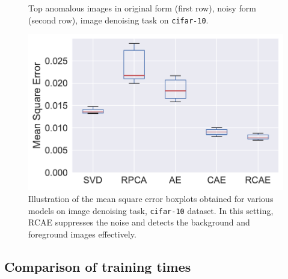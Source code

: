 \begin{figure}[!t]
	\centering
	\caption{Top anomalous images in original form (first row), noisy form (second row),
	image denoising task on {\tt cifar-10}.}
	\label{fig:results-cifar-injection}
\end{figure}

\begin{figure}[!t]
	\centering
	\includegraphics[scale=0.5]{images/cifar_10_mse.pdf}
	\caption{Illustration of the mean square error boxplots obtained for various models on image denoising task, {\tt cifar-10} dataset.
		In this setting, RCAE suppresses the noise and detects the background and foreground images effectively.}
	\label{fig:denoising-results}
\end{figure}


\subsection{Comparison of training times}
\label{sec:runtime}

